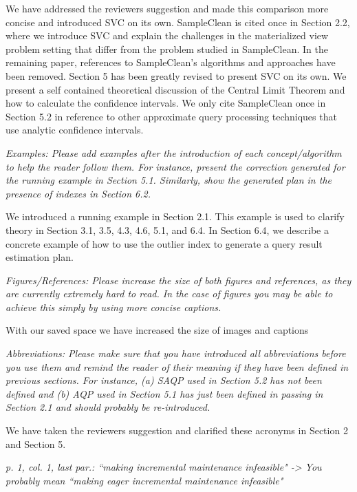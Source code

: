 We have addressed the reviewers suggestion and made this comparison more concise and introduced SVC on its own. SampleClean is cited once in Section 2.2, where we introduce SVC and explain the challenges in the materialized view problem setting that differ from the problem studied in SampleClean. In the remaining paper, references to SampleClean’s algorithms and approaches have been removed. Section 5 has been greatly revised to present SVC on its own. We present a self contained theoretical discussion of the Central Limit Theorem and how to calculate the confidence intervals. We only cite SampleClean once in Section 5.2 in reference to other approximate query processing techniques that use analytic confidence intervals.

\vspace{1em}
\emph{Examples: Please add examples after the introduction of each concept/algorithm to help the reader follow them. For instance, present the correction generated for the running example in Section 5.1. Similarly, show the generated plan in the presence of indexes in Section 6.2.}

We introduced a running example in Section 2.1. This example is used to clarify theory in Section 3.1, 3.5, 4.3, 4.6, 5.1, and 6.4. In Section 6.4, we describe a concrete example of how to use the outlier index to generate a query result estimation plan.

\vspace{1em}
\emph{Figures/References: Please increase the size of both figures and references, as they are currently extremely hard to read. In the case of figures you may be able to achieve this simply by using more concise captions.}

With our saved space we have increased the size of images and captions

\vspace{1em}
\emph{Abbreviations: Please make sure that you have introduced all abbreviations before you use them and remind the reader of their meaning if they have been defined in previous sections. For instance, (a) SAQP used in Section 5.2 has not been defined and (b) AQP used in Section 5.1 has just been defined in passing in Section 2.1 and should probably be re-introduced.}

We have taken the reviewers suggestion and clarified these acronyms in Section 2 and Section 5.

\vspace{1em}
\emph{p. 1, col. 1, last par.: ``making incremental maintenance infeasible" -> You probably mean ``making eager incremental maintenance infeasible"}

